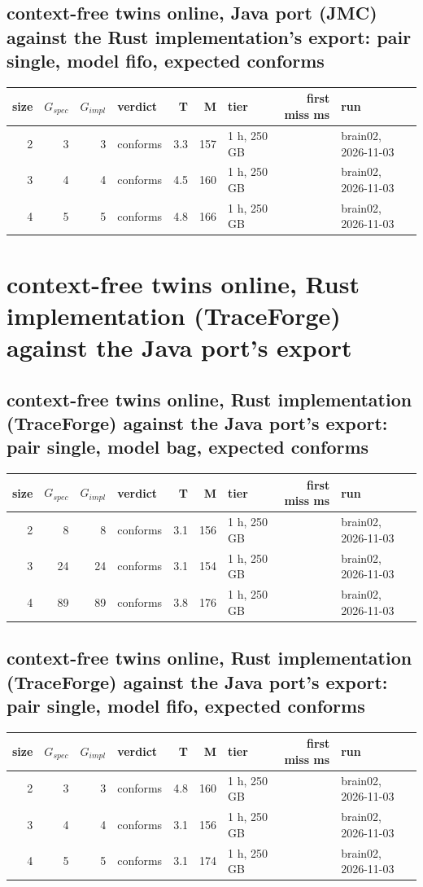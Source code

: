 \documentclass[10pt]{article}
\begin{document}
\subsection*{context-free twins online, Java port (JMC) against the Rust implementation's export: pair \textsf{single}, model fifo, expected conforms}
\begin{longtable}{@{}rrrlrrlrl@{}}
\toprule
size & $G_{\mathit{spec}}$ & $G_{\mathit{impl}}$ & verdict & T & M & tier & first miss ms & run \\
\midrule
\endhead
\color{red} 2 & 3 & 3 & conforms & 3.3 & 157 & 1 h, 250 GB &  & brain02, 2026-11-03 \\
\color{blue} 3 & 4 & 4 & conforms & 4.5 & 160 & 1 h, 250 GB &  & brain02, 2026-11-03 \\
\color{blue} 4 & 5 & 5 & conforms & 4.8 & 166 & 1 h, 250 GB &  & brain02, 2026-11-03 \\
\bottomrule
\end{longtable}
\section*{context-free twins online, Rust implementation (TraceForge) against the Java port's export}
\subsection*{context-free twins online, Rust implementation (TraceForge) against the Java port's export: pair \textsf{single}, model bag, expected conforms}
\begin{longtable}{@{}rrrlrrlrl@{}}
\toprule
size & $G_{\mathit{spec}}$ & $G_{\mathit{impl}}$ & verdict & T & M & tier & first miss ms & run \\
\midrule
\endhead
\color{red} 2 & 8 & 8 & conforms & 3.1 & 156 & 1 h, 250 GB &  & brain02, 2026-11-03 \\
\color{red} 3 & 24 & 24 & conforms & 3.1 & 154 & 1 h, 250 GB &  & brain02, 2026-11-03 \\
\color{red} 4 & 89 & 89 & conforms & 3.8 & 176 & 1 h, 250 GB &  & brain02, 2026-11-03 \\
\bottomrule
\end{longtable}
\subsection*{context-free twins online, Rust implementation (TraceForge) against the Java port's export: pair \textsf{single}, model fifo, expected conforms}
\begin{longtable}{@{}rrrlrrlrl@{}}
\toprule
size & $G_{\mathit{spec}}$ & $G_{\mathit{impl}}$ & verdict & T & M & tier & first miss ms & run \\
\midrule
\endhead
\color{red} 2 & 3 & 3 & conforms & 4.8 & 160 & 1 h, 250 GB &  & brain02, 2026-11-03 \\
\color{red} 3 & 4 & 4 & conforms & 3.1 & 156 & 1 h, 250 GB &  & brain02, 2026-11-03 \\
\color{red} 4 & 5 & 5 & conforms & 3.1 & 174 & 1 h, 250 GB &  & brain02, 2026-11-03 \\
\bottomrule
\end{longtable}
\end{document}
